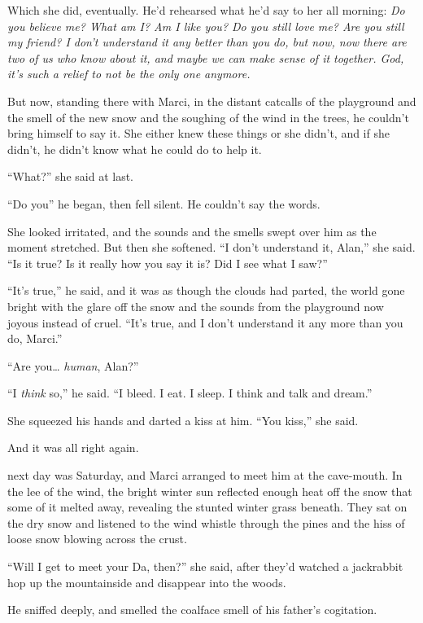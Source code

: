 Which she did, eventually.  He'd rehearsed what he'd say to her all
morning:  \textit{Do you believe me?  What am I?  Am I like you?  Do
you still love me?  Are you still my friend?  I don't understand it
any better than you do, but now, now there are two of us who know
about it, and maybe we can make sense of it together.  God, it's such
a relief to not be the only one anymore.}

But now, standing there with Marci, in the distant catcalls of the
playground and the smell of the new snow and the soughing of the wind
in the trees, he couldn't bring himself to say it.  She either knew
these things or she didn't, and if she didn't, he didn't know what he
could do to help it.

``What?'' she said at last.

``Do you\dash{}'' he began, then fell silent.  He couldn't say the words.

She looked irritated, and the sounds and the smells swept over him as
the moment stretched.  But then she softened.  ``I don't understand
it, Alan,'' she said.  ``Is it true?  Is it really how you say it is? 
Did I see what I saw?''

``It's true,'' he said, and it was as though the clouds had parted,
the world gone bright with the glare off the snow and the sounds from
the playground now joyous instead of cruel.  ``It's true, and I don't
understand it any more than you do, Marci.''

``Are you\ldots{}  \textit{human}, Alan?''

``I \textit{think} so,'' he said.  ``I bleed.  I eat.  I sleep.  I
think and talk and dream.''

She squeezed his hands and darted a kiss at him.  ``You kiss,'' she
said.

And it was all right again.

 next day was Saturday, and Marci arranged to meet him at the
cave-mouth.  In the lee of the wind, the bright winter sun reflected
enough heat off the snow that some of it melted away, revealing the
stunted winter grass beneath.  They sat on the dry snow and listened
to the wind whistle through the pines and the hiss of loose snow
blowing across the crust.

``Will I get to meet your Da, then?'' she said, after they'd watched a
jackrabbit hop up the mountainside and disappear into the woods.

He sniffed deeply, and smelled the coalface smell of his father's
cogitation.

